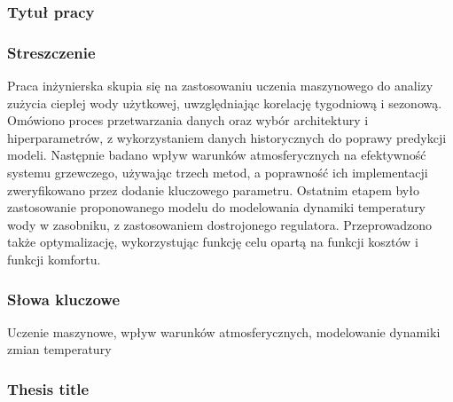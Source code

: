 \documentclass[a4paper,twoside,12pt]{book}
\begin{document}


\cleardoublepage

\rmfamily\normalfont
\pagestyle{empty}



\subsubsection*{Tytuł pracy}
\Title

\subsubsection*{Streszczenie}
Praca inżynierska skupia się na zastosowaniu uczenia maszynowego do analizy zużycia ciepłej wody użytkowej, uwzględniając korelację tygodniową i sezonową. Omówiono proces przetwarzania danych oraz wybór architektury i hiperparametrów, z wykorzystaniem danych historycznych do poprawy predykcji modeli. Następnie badano wpływ warunków atmosferycznych na efektywność systemu grzewczego, używając trzech metod, a poprawność ich implementacji zweryfikowano przez dodanie kluczowego parametru. Ostatnim etapem było zastosowanie proponowanego modelu do modelowania dynamiki temperatury wody w zasobniku, z zastosowaniem dostrojonego regulatora. Przeprowadzono także optymalizację, wykorzystując funkcję celu opartą na funkcji kosztów i funkcji komfortu.
\subsubsection*{Słowa kluczowe}
Uczenie maszynowe, wpływ warunków atmosferycznych, modelowanie dynamiki zmian temperatury

\subsubsection*{Thesis title}
\begin{otherlanguage}{british}
  \TitleAlt
\end{otherlanguage}
\end{document}
